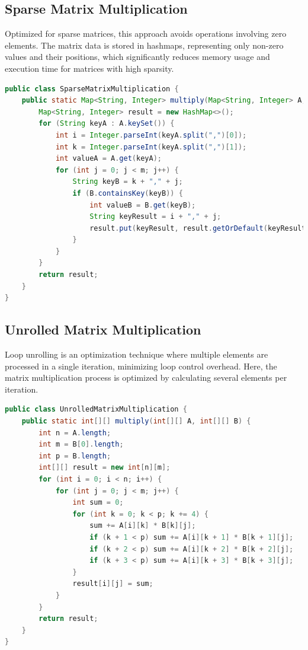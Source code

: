 \documentclass{article}
\begin{document}
\subsection{Sparse Matrix Multiplication}
Optimized for sparse matrices, this approach avoids operations involving zero elements. The matrix data is stored in hashmaps, representing only non-zero values and their positions, which significantly reduces memory usage and execution time for matrices with high sparsity.

\begin{lstlisting}[language=Java]
public class SparseMatrixMultiplication {
    public static Map<String, Integer> multiply(Map<String, Integer> A, Map<String, Integer> B, int n, int m, int p) {
        Map<String, Integer> result = new HashMap<>();
        for (String keyA : A.keySet()) {
            int i = Integer.parseInt(keyA.split(",")[0]);
            int k = Integer.parseInt(keyA.split(",")[1]);
            int valueA = A.get(keyA);
            for (int j = 0; j < m; j++) {
                String keyB = k + "," + j;
                if (B.containsKey(keyB)) {
                    int valueB = B.get(keyB);
                    String keyResult = i + "," + j;
                    result.put(keyResult, result.getOrDefault(keyResult, 0) + valueA * valueB);
                }
            }
        }
        return result;
    }
}
\end{lstlisting}

\subsection{Unrolled Matrix Multiplication}
Loop unrolling is an optimization technique where multiple elements are processed in a single iteration, minimizing loop control overhead. Here, the matrix multiplication process is optimized by calculating several elements per iteration.

\begin{lstlisting}[language=Java]
public class UnrolledMatrixMultiplication {
    public static int[][] multiply(int[][] A, int[][] B) {
        int n = A.length;
        int m = B[0].length;
        int p = B.length;
        int[][] result = new int[n][m];
        for (int i = 0; i < n; i++) {
            for (int j = 0; j < m; j++) {
                int sum = 0;
                for (int k = 0; k < p; k += 4) {
                    sum += A[i][k] * B[k][j];
                    if (k + 1 < p) sum += A[i][k + 1] * B[k + 1][j];
                    if (k + 2 < p) sum += A[i][k + 2] * B[k + 2][j];
                    if (k + 3 < p) sum += A[i][k + 3] * B[k + 3][j];
                }
                result[i][j] = sum;
            }
        }
        return result;
    }
}
\end{lstlisting}
\end{document}
